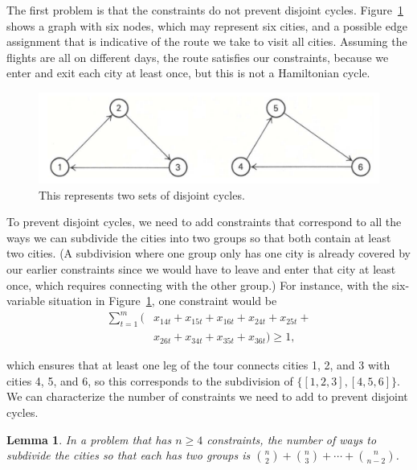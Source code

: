 \documentclass{article}
\newtheorem{lem}[thm]{Lemma}
\begin{document}
The first problem is that the constraints do not prevent disjoint cycles. Figure~\ref{fig:bad_solution} shows a graph with six nodes, which may
represent six cities, and a possible edge assignment that is indicative of the route we take to visit all cities. Assuming the flights are all on
different days, the route satisfies our constraints, because we enter and exit each city at least once, but this is not a Hamiltonian cycle.

\begin{figure}[t]
\vskip 0.2in
\begin{center}
\centerline{\includegraphics[width=\columnwidth]{bad_solution}}
\caption{This represents two sets of disjoint cycles.}
\label{fig:bad_solution}
\end{center}
\vskip -0.2in
\end{figure}

To prevent disjoint cycles, we need to add constraints that correspond to all the ways we can subdivide the cities into two groups so that both
contain at least two cities. (A subdivision where one group only has one city is already covered by our earlier constraints since we would have to
leave and enter that city at least once, which requires connecting with the other group.) For instance, with the six-variable situation in
Figure~\ref{fig:bad_solution}, one constraint would be
\begin{align}
\sum_{t=1}^{m} (&x_{14t} + x_{15t} + x_{16t} + x_{24t} + x_{25t} + \\
& x_{26t} + x_{34t} + x_{35t} + x_{36t}) \ge 1, \nonumber
\end{align}

which ensures that at least one leg of the tour connects cities 1, 2, and 3 with cities 4, 5, and 6, so this corresponds to the subdivision of
$\{[1,2,3],[4,5,6]\}$. We can characterize the number of constraints we need to add to prevent disjoint cycles.

\begin{lem}\label{lem:cycle_constraints}
In a problem that has $n \ge 4$ constraints, the number of ways to subdivide the cities so that each has two groups is ${n \choose 2} + {n \choose 3}
+ \cdots + {n \choose n-2}$.
\end{lem}
\end{document}
